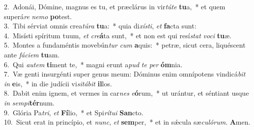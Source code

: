 {2.~}Adonái, Dómine, magnus es tu, et præclárus in vir\textit{tú}\textit{te} \textbf{tu}a,~* et quem superá\textit{re} \textit{ne}\textit{mo} \textbf{po}test.\\
{3.~}Tibi sérviat omnis crea\textit{tú}\textit{ra} \textbf{tu}a:~* quia di\textit{xí}\textit{sti}, \textit{et} \textbf{fa}cta sunt:\\
{4.~}Misísti spíritum tuum, \textit{et} \textit{cre}\textbf{á}ta sunt,~* et non est qui resí\textit{stat} \textit{vo}\textit{ci} \textbf{tu}æ.\\
{5.~}Montes a fundaméntis movebún\textit{tur} \textit{cum} \textbf{a}quis:~* petræ, sicut cera, liquéscent ante \textit{fá}\textit{ci}\textit{em} \textbf{tu}am.\\
{6.~}Qui \textit{au}\textit{tem} \textbf{ti}ment te,~* magni erunt a\textit{pud} \textit{te} \textit{per} \textbf{óm}nia.\\
{7.~}Væ genti insurgénti super genus meum: Dóminus enim omnípotens vindicá\textit{bit} \textit{in} \textbf{e}is,~* in die judícii vi\textit{si}\textit{tá}\textit{bit} \textbf{il}los.\\
{8.~}Dabit enim ignem, et vermes in car\textit{nes} \textit{e}\textbf{ó}rum,~* ut urántur, et séntiant usque \textit{in} \textit{sem}\textit{pi}\textbf{tér}num.\\
{9.~}Glória Pa\textit{tri}, \textit{et} \textbf{Fí}lio,~* et Spi\textit{rí}\textit{tu}\textit{i} \textbf{San}cto.\\
{10.~}Sicut erat in princípio, et \textit{nunc}, \textit{et} \textbf{sem}per,~* et in sǽcula sæ\textit{cu}\textit{ló}\textit{rum}. \textbf{A}men.\\
